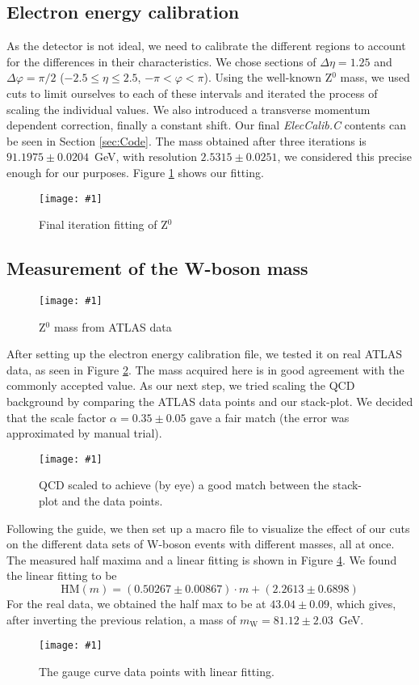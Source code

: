 \documentclass[twocolumn]{article}
\newcommand{\insertFigure}[1]{%
   \texttt{[image: \#1]}%
}
\begin{document}
\subsection{Electron energy calibration}
As the detector is not ideal, we need to calibrate the different regions to account for the differences in their characteristics. We chose sections of $\Delta \eta = 1.25$ and $\Delta \varphi = \pi/2$ ($-2.5 \leq \eta \leq 2.5$, $-\pi < \varphi < \pi$). Using the well-known Z$^0$ mass, we used cuts to limit ourselves to each of these intervals and iterated the process of scaling the individual values. We also introduced a transverse momentum dependent correction, finally a constant shift. Our final \textsl{ElecCalib.C} contents can be seen in Section \ref{sec:Code}. The mass obtained after three iterations is $91.1975 \pm 0.0204$~GeV, with resolution $2.5315 \pm 0.0251$, we considered this precise enough for our purposes. Figure \ref{fig:final_iteration} shows our fitting.
\begin{figure}
\centering
\insertFigure{Images/FinalIteration.png}
\caption{Final iteration fitting of Z$^0$}
\label{fig:final_iteration}
\end{figure}
\subsection{Measurement of the W-boson mass}
\begin{figure}
\centering
\insertFigure{Images/FirstWFit.png}
\caption{Z$^0$ mass from ATLAS data}
\label{fig:Z0ATLAS}
\end{figure}
After setting up the electron energy calibration file, we tested it on real ATLAS data, as seen in Figure \ref{fig:Z0ATLAS}. The mass acquired here is in good agreement with the commonly accepted value. As our next step, we tried scaling the QCD background by comparing the ATLAS data points and our stack-plot. We decided that the scale factor $\alpha = 0.35 \pm 0.05$ gave a fair match (the error was approximated by manual trial).
\begin{figure}
\centering
\insertFigure{Images/ptw_scale.png}
\caption{QCD scaled to achieve (by eye) a good match between the stack-plot and the data points.}
\label{fig:QCDscalefactor}
\end{figure}
Following the guide, we then set up a macro file to visualize the effect of our cuts on the different data sets of W-boson events with different masses, all at once. The measured half maxima and a linear fitting is shown in Figure \ref{fig:gaugecurve}. We found the linear fitting to be
\begin{equation}\nonumber
\text{HM}(m) = (0.50267 \pm 0.00867)\cdot m + (2.2613 \pm 0.6898)
\end{equation}
For the real data, we obtained the half max to be at $43.04 \pm 0.09$, which gives, after inverting the previous relation, a mass of $m_\text{W} = 81.12 \pm 2.03$~GeV.
\begin{figure}
\centering
\insertFigure{Images/Jacobihalfmax.png}
\caption{The gauge curve data points with linear fitting.}
\label{fig:gaugecurve}
\end{figure}
\end{document}
